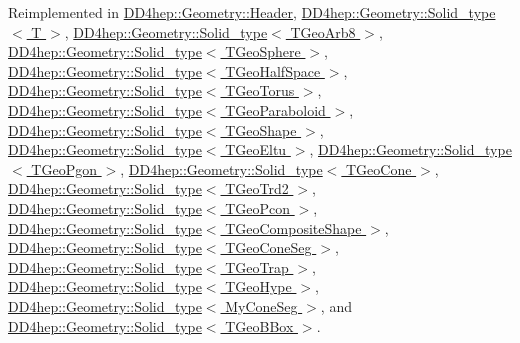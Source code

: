 Reimplemented in \hyperlink{class_d_d4hep_1_1_geometry_1_1_header_a56f8ff7aee494b00bb948dbc2cf55275}{DD4hep::Geometry::Header}, \hyperlink{class_d_d4hep_1_1_geometry_1_1_solid__type_a2e1c12b2d84add0bc77ced60600339aa}{DD4hep::Geometry::Solid\_\-type$<$ T $>$}, \hyperlink{class_d_d4hep_1_1_geometry_1_1_solid__type_a2e1c12b2d84add0bc77ced60600339aa}{DD4hep::Geometry::Solid\_\-type$<$ TGeoArb8 $>$}, \hyperlink{class_d_d4hep_1_1_geometry_1_1_solid__type_a2e1c12b2d84add0bc77ced60600339aa}{DD4hep::Geometry::Solid\_\-type$<$ TGeoSphere $>$}, \hyperlink{class_d_d4hep_1_1_geometry_1_1_solid__type_a2e1c12b2d84add0bc77ced60600339aa}{DD4hep::Geometry::Solid\_\-type$<$ TGeoHalfSpace $>$}, \hyperlink{class_d_d4hep_1_1_geometry_1_1_solid__type_a2e1c12b2d84add0bc77ced60600339aa}{DD4hep::Geometry::Solid\_\-type$<$ TGeoTorus $>$}, \hyperlink{class_d_d4hep_1_1_geometry_1_1_solid__type_a2e1c12b2d84add0bc77ced60600339aa}{DD4hep::Geometry::Solid\_\-type$<$ TGeoParaboloid $>$}, \hyperlink{class_d_d4hep_1_1_geometry_1_1_solid__type_a2e1c12b2d84add0bc77ced60600339aa}{DD4hep::Geometry::Solid\_\-type$<$ TGeoShape $>$}, \hyperlink{class_d_d4hep_1_1_geometry_1_1_solid__type_a2e1c12b2d84add0bc77ced60600339aa}{DD4hep::Geometry::Solid\_\-type$<$ TGeoEltu $>$}, \hyperlink{class_d_d4hep_1_1_geometry_1_1_solid__type_a2e1c12b2d84add0bc77ced60600339aa}{DD4hep::Geometry::Solid\_\-type$<$ TGeoPgon $>$}, \hyperlink{class_d_d4hep_1_1_geometry_1_1_solid__type_a2e1c12b2d84add0bc77ced60600339aa}{DD4hep::Geometry::Solid\_\-type$<$ TGeoCone $>$}, \hyperlink{class_d_d4hep_1_1_geometry_1_1_solid__type_a2e1c12b2d84add0bc77ced60600339aa}{DD4hep::Geometry::Solid\_\-type$<$ TGeoTrd2 $>$}, \hyperlink{class_d_d4hep_1_1_geometry_1_1_solid__type_a2e1c12b2d84add0bc77ced60600339aa}{DD4hep::Geometry::Solid\_\-type$<$ TGeoPcon $>$}, \hyperlink{class_d_d4hep_1_1_geometry_1_1_solid__type_a2e1c12b2d84add0bc77ced60600339aa}{DD4hep::Geometry::Solid\_\-type$<$ TGeoCompositeShape $>$}, \hyperlink{class_d_d4hep_1_1_geometry_1_1_solid__type_a2e1c12b2d84add0bc77ced60600339aa}{DD4hep::Geometry::Solid\_\-type$<$ TGeoConeSeg $>$}, \hyperlink{class_d_d4hep_1_1_geometry_1_1_solid__type_a2e1c12b2d84add0bc77ced60600339aa}{DD4hep::Geometry::Solid\_\-type$<$ TGeoTrap $>$}, \hyperlink{class_d_d4hep_1_1_geometry_1_1_solid__type_a2e1c12b2d84add0bc77ced60600339aa}{DD4hep::Geometry::Solid\_\-type$<$ TGeoHype $>$}, \hyperlink{class_d_d4hep_1_1_geometry_1_1_solid__type_a2e1c12b2d84add0bc77ced60600339aa}{DD4hep::Geometry::Solid\_\-type$<$ MyConeSeg $>$}, and \hyperlink{class_d_d4hep_1_1_geometry_1_1_solid__type_a2e1c12b2d84add0bc77ced60600339aa}{DD4hep::Geometry::Solid\_\-type$<$ TGeoBBox $>$}.

